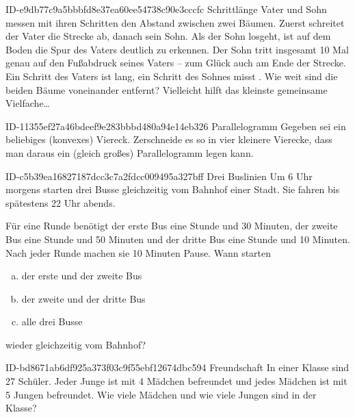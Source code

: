 \begin{exercise}
      {ID-e9db77c9a5bbbfd8e37ea60ee54738c90e3cccfc}
      {Schrittlänge}
  \ifproblem\problem
    Vater und Sohn messen mit ihren Schritten den Abstand zwischen zwei Bäumen.
    Zuerst schreitet der Vater die Strecke ab, danach sein Sohn. Als der Sohn
    losgeht, ist auf dem Boden die Spur des Vaters deutlich zu erkennen.
    Der Sohn tritt insgesamt 10 Mal genau auf den Fußabdruck seines Vaters --
    zum Glück auch am Ende der Strecke. Ein Schritt des Vaters ist 
    lang, ein Schritt des Sohnes misst . Wie weit sind die beiden
    Bäume voneinander entfernt?
  \fi
  \ifoutline\outline
    Vielleicht hilft das kleinste gemeinsame Vielfache\ldots
  \fi
\end{exercise}

\begin{exercise}
      {ID-11355ef27a46bdeef9e283bbbd480a94e14eb326}
      {Parallelogramm}
  \ifproblem\problem
    Gegeben sei ein beliebiges (konvexes) Viereck. Zerschneide es so in vier
    kleinere Vierecke, dass man daraus ein (gleich großes) Parallelogramm legen
    kann.
  \fi
\end{exercise}

\begin{exercise}
      {ID-c5b39ea16827187dcc3c7a2fdcc009495a327bff}
      {Drei Buslinien}
  \ifproblem\problem
    Um 6 Uhr morgens starten drei Busse gleichzeitig vom Bahnhof einer Stadt.
    Sie fahren bis spätestens 22 Uhr abends.\par
    Für eine Runde benötigt
    der erste Bus eine Stunde und 30 Minuten,
    der zweite Bus eine Stunde und 50 Minuten und
    der dritte Bus eine Stunde und 10 Minuten.
    Nach jeder Runde machen sie 10 Minuten Pause.
    Wann starten
    \begin{enumerate}[a)]
      \item der erste und der zweite Bus
      \item der zweite und der dritte Bus
      \item alle drei Busse
    \end{enumerate}
    wieder gleichzeitig vom Bahnhof?
  \fi
\end{exercise}

\begin{exercise}
      {ID-bd8671ab6df925a373f03c9f55ebf12674dbc594}
      {Freundschaft}
  \ifproblem\problem
    In einer Klasse sind 27 Schüler. Jeder Junge ist mit 4 Mädchen befreundet
    und jedes Mädchen ist mit 5 Jungen befreundet. Wie viele Mädchen und wie
    viele Jungen sind in der Klasse?
  \fi
\end{exercise}

